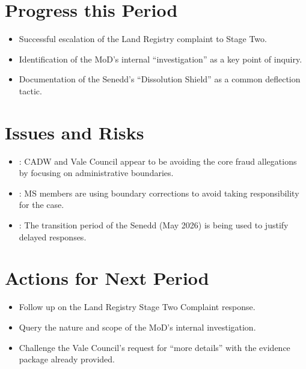 \documentclass[letterpaper,10pt,openany,oneside,english]{sphinxmanual}
\begin{document}
\section{Progress this Period}
\label{\detokenize{highlight:progress-this-period}}\begin{itemize}
\item {} 
\sphinxAtStartPar
Successful escalation of the Land Registry complaint to Stage Two.

\item {} 
\sphinxAtStartPar
Identification of the MoD’s internal “investigation” as a key point of inquiry.

\item {} 
\sphinxAtStartPar
Documentation of the Senedd’s “Dissolution Shield” as a common deflection tactic.

\end{itemize}


\section{Issues and Risks}
\label{\detokenize{highlight:issues-and-risks}}\begin{itemize}
\item {} 
\sphinxAtStartPar
{}: CADW and Vale Council appear to be avoiding the core fraud allegations by focusing on administrative boundaries.

\item {} 
\sphinxAtStartPar
{}: MS members are using boundary corrections to avoid taking responsibility for the case.

\item {} 
\sphinxAtStartPar
{}: The transition period of the Senedd (May 2026) is being used to justify delayed responses.

\end{itemize}


\section{Actions for Next Period}
\label{\detokenize{highlight:actions-for-next-period}}\begin{itemize}
\item {} 
\sphinxAtStartPar
Follow up on the Land Registry Stage Two Complaint response.

\item {} 
\sphinxAtStartPar
Query the nature and scope of the MoD’s internal investigation.

\item {} 
\sphinxAtStartPar
Challenge the Vale Council’s request for “more details” with the evidence package already provided.

\end{itemize}
\end{document}
